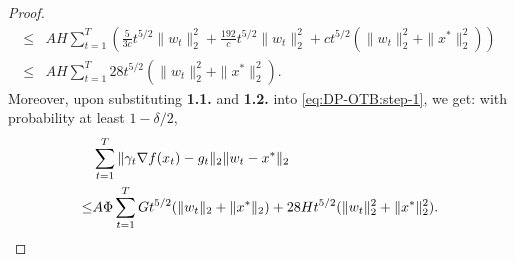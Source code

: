 \begin{proof}
\begin{align*}
    \leq & AH \sum_{t=1}^T \left(\frac{5}{3c}t^{5/2}\|w_t\|_2^2 + \frac{192}{c}t^{5/2}\|w_t\|_2^2 + ct^{5/2}(\|w_t\|_2^2+\|x^*\|_2^2) \right) \\
    \leq & AH \sum_{t=1}^T 28 t^{5/2}(\|w_t\|_2^2+\|x^*\|_2^2).
\end{align*}
Moreover, upon substituting \textbf{1.1.} and \textbf{1.2.} into \eqref{eq:DP-OTB:step-1}, we get: with probability at least $1-\delta/2$,
\begin{align*}
    &\sum_{t=1}^T\|\gamma_t\nabla f(x_t)-g_t\|_2\|w_t-x^*\|_2 \\
    \leq & A\Phi\sum_{t=1}^T  Gt^{5/2}(\|w_t\|_2+\|x^*\|_2) + 28Ht^{5/2} (\|w_t\|_2^2+\|x^*\|_2^2).
\end{align*}


\end{proof}
